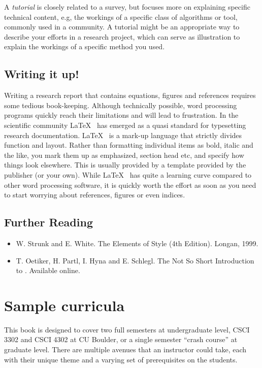 \documentclass[paper=6.14in:9.21in,pagesize=pdftex,11pt,twoside,openright]{scrbook}
\begin{document}
A \emph{tutorial} is closely related to a survey, but focuses more on explaining specific technical content, e.g, the workings of a specific class of algorithms or tool, commonly used in a community. A tutorial might be an appropriate way to describe your efforts in a research project, which can serve as illustration to explain the workings of a specific method you used.

\section{Writing it up!}
Writing a research report that contains equations, figures and references requires some tedious book-keeping. Although technically possible, word processing programs quickly reach their limitations and will lead to frustration. In the scientific community \LaTeX~ has emerged as a quasi standard for typesetting research documentation. \LaTeX~ is a mark-up language that strictly divides function and layout. Rather than formatting individual items as bold, italic and the like, you mark them up as emphasized, section head etc, and specify how things look elsewhere. This is usually provided by a template provided by the publisher (or your own). While \LaTeX~ has quite a learning curve compared to other word processing software, it is quickly worth the effort as soon as you need to start worrying about references, figures or even indices.

\section*{Further Reading}

\begin{itemize}
\item W. Strunk and E. White. The Elements of Style (4th Edition). Longan, 1999.
\item T. Oetiker, H. Partl, I. Hyna and E. Schlegl. The Not So Short Introduction to \LaTeXe. Available online.
\end{itemize}

\chapter{Sample curricula}

This book is designed to cover two full semesters at undergraduate level, CSCI 3302 and CSCI 4302 at CU Boulder, or a single semester ``crash course'' at graduate level. There are multiple avenues that an instructor could take, each with their unique theme and a varying set of prerequisites on the students.
\end{document}

